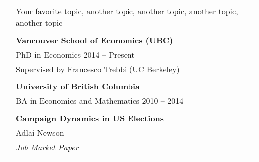 \documentclass[letterpaper, 11pt]{article}
\begin{document}
\begin{longtable}{p{1.3in}p{4.8in}}


\nohyphens{\color{OliveGreen}{Research interests}}
& Your favorite topic, another topic, another topic, another topic, another topic \\
& \\


\color{OliveGreen}{Education} 
& \textbf{Vancouver School of Economics (UBC)} \hfill \\ 
& PhD in Economics \hfill  2014 -- Present \\
& Supervised by Francesco Trebbi (UC Berkeley)\\
& \\

& \textbf{University of British Columbia} \hfill  \\
& BA in Economics and Mathematics \hfill 2010 -- 2014 \\
& \\






\nohyphens{\color{OliveGreen}{Ongoing Research}}
& \textbf{Campaign Dynamics in US Elections} \\
& Adlai Newson \\
& \textit{Job Market Paper}\\
& \\


\end{longtable}
\end{document}
